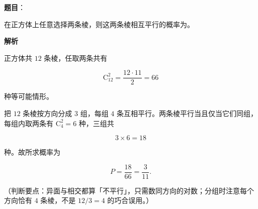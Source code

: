 \begin{answer}

\textbf{题目}：

在正方体上任意选择两条棱，则这两条棱相互平行的概率为\gkblank{}。

\textbf{解析}

正方体共 $12$ 条棱，任取两条共有

\nopagebreak[4]
\[\mathrm C_{12}^2=\frac{12\cdot11}{2}=66\]

种等可能情形。

把 $12$ 条棱按方向分成 $3$ 组，每组 $4$ 条互相平行。两条棱平行当且仅当它们同组，每组内取两条有 $\mathrm C_4^2=6$ 种，三组共

\nopagebreak[4]
\[3\times6=18\]

种。故所求概率为

\nopagebreak[4]
\[P=\frac{18}{66}=\frac{3}{11}.\]

（判断要点：异面与相交都算「不平行」，只需数同方向的对数；分组时注意每个方向恰有 $4$ 条棱，不是 $12/3=4$ 的巧合误用。）


\end{answer}
